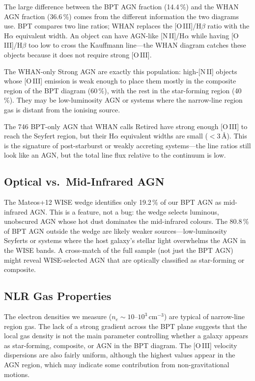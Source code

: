 \documentclass[a4paper,12pt]{article}
\begin{document}
The large difference between the BPT AGN fraction (14.4\,\%) and the
WHAN AGN fraction (36.6\,\%) comes from the different information the
two diagrams use.  BPT compares two line ratios; WHAN replaces the
[O\,III]/H$\beta$ ratio with the H$\alpha$ equivalent width.  An object
can have AGN-like [N\,II]/H$\alpha$ while having [O\,III]/H$\beta$
too low to cross the Kauffmann line---the WHAN diagram catches these
objects because it does not require strong [O\,III].

The \woStrongCount{} WHAN-only Strong AGN are exactly this population:
high-[N\,II] objects whose [O\,III] emission is weak enough to place
them mostly in the composite region of the BPT diagram (60\,\%), with
the rest in the star-forming region (40\,\%).  They may be
low-luminosity AGN or systems where the narrow-line region gas is
distant from the ionising source.

The 746 BPT-only AGN that WHAN calls Retired have strong enough
[O\,III] to reach the Seyfert region, but their H$\alpha$ equivalent
widths are small ($<3$\,\AA).  This is the signature of
post-starburst or weakly accreting systems---the line ratios still look
like an AGN, but the total line flux relative to the continuum is low.

\subsection{Optical vs.\ Mid-Infrared AGN}

The Mateos+12 WISE wedge identifies only 19.2\,\% of our BPT AGN as
mid-infrared AGN.  This is a feature, not a bug: the wedge selects
luminous, unobscured AGN whose hot dust dominates the mid-infrared
colours.  The 80.8\,\% of BPT AGN outside the wedge are likely weaker
sources---low-luminosity Seyferts or systems where the host galaxy's
stellar light overwhelms the AGN in the WISE bands.  A cross-match of
the full sample (not just the BPT AGN) might reveal
WISE-selected AGN that are optically classified as star-forming or
composite.

\subsection{NLR Gas Properties}

The electron densities we measure ($n_e \sim 10$--$10^3$\,cm$^{-3}$)
are typical of narrow-line region gas.  The lack of a strong gradient
across the BPT plane suggests that the local gas density is not the
main parameter controlling whether a galaxy appears as star-forming,
composite, or AGN in the BPT diagram.  The [O\,III] velocity
dispersions are also fairly uniform, although the highest values appear
in the AGN region, which may indicate some contribution from
non-gravitational motions.
\end{document}
